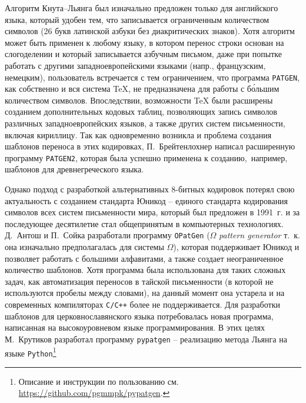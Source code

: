 \documentclass[12pt,a4paper,oneside]{extarticle}
\begin{document}
Алгоритм Кнута--Льянга был изначально предложен только для английского языка, который удобен тем, что записывается ограниченным количеством символов (26 букв латинской азбуки без диакритических знаков). Хотя алгоритм может быть применен к любому языку, в котором перенос строки основан на слогоделении и который записывается азбучным письмом, даже при попытке работать с другими западноевропейскими языками (напр., французским, немецким), пользователь встречается с тем ограничением, что программа \verb+PATGEN+, как собственно и вся система \TeX{}, не предназначена для работы с бо́льшим количеством символов. Впоследствии, возможности \TeX{} были расширены созданием дополнительных кодовых таблиц, позволяющих запись символов различных западноевропейских языков\autocite[Кодировка \textenglish{Extended \TeX{} Font Encoding Scheme} (ET). См. ][]{ferguson1990}, а также других систем письменности, включая кириллицу\autocite[Описание существующих кодировок см. ][]{mittelbach2016}. Так как одновременно возникла и проблема создания шаблонов переноса в этих кодировках, П.~Брейтенлохнер написал расширенную программу \verb+PATGEN2+\autocite[См. описание в пособии ][]{patgen2}, которая была успешно применена к созданию, например, шаблонов для древнегреческого языка\autocite[][]{haralambous1992}.

Однако подход с разработкой альтернативных 8-битных кодировок потерял свою актуальность с созданием стандарта Юникод -- единого стандарта кодирования символов всех систем письменности мира, который был предложен в 1991~г. и за последующее десятилетие стал общепринятым в компьютерных технологиях. Д.~Антош и  П.~Сойка разработали программу \verb+OPatGen+ ($\Omega$ \emph{pattern generator} т.~к. она изначально предполагалась для системы $\Omega$), которая поддерживает Юникод и позволяет работать с большими алфавитами, а также создает неограниченное количество шаблонов\autocite[][]{opatgen}. Хотя программа была использована для таких сложных задач, как автоматизация переносов в тайской письменности (в которой не используются пробелы между словами)\autocite[][]{sojka2003}, на данный момент она устарела и на современных компиляторах \verb!C/C++! более не поддерживается. Для разработки шаблонов для церковнославянского языка потребовалась новая программа, написанная на  высокоуровневом языке программирования. В этих целях М.~Крутиков разработал программу \verb+pypatgen+ -- реализацию метода Льянга на языке \verb+Python+\footnote{Описание и инструкции по пользованию см. \url{https://github.com/pgmmpk/pypatgen}.}
\end{document}
